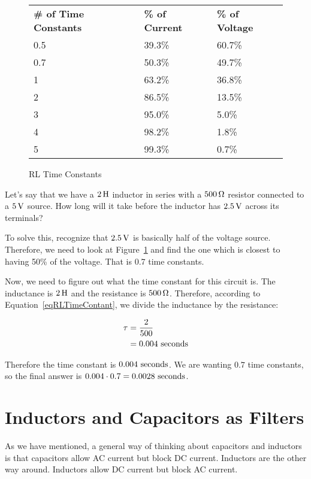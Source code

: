 \begin{figure}
\caption{RL Time Constants}
\label{figRLTimeConstants}
\begin{tabular}{|l|l|l}
\textbf{\# of Time Constants} & \textbf{\% of Current} & \textbf{\% of Voltage} \\
0.5 & 39.3\% & 60.7\% \\
0.7 & 50.3\% & 49.7\% \\
1 & 63.2\% & 36.8\% \\
2 & 86.5\% & 13.5\% \\
3 & 95.0\% & 5.0\% \\
4 & 98.2\% & 1.8\% \\
5 & 99.3\% & 0.7\% \\
\end{tabular}
\end{figure}

\begin{exampleprob}
Let's say that we have a $2\myhy$ inductor in series with a $500\,\si{\ohm}$ resistor connected to a $5\,\si{\volt}$ source.
How long will it take before the inductor has $2.5\,\si{\volt}$ across its terminals?

To solve this, recognize that $2.5\,\si{\volt}$ is basically half of the voltage source.
Therefore, we need to look at Figure~\ref{figRLTimeConstants} and find the one which is closest to having 50\% of the voltage.
That is 0.7 time constants.

Now, we need to figure out what the time constant for this circuit is.
The inductance is $2\myhy$ and the resistance is $500\,\si{\ohm}$.  
Therefore, according to Equation~\ref{eqRLTimeContant}, we divide the inductance by the resistance:

\begin{align*}
\tau &= \frac{2}{500} \\
     &= 0.004\textrm{ seconds}
\end{align*}

Therefore the time constant is $0.004\textrm{ seconds}$.
We are wanting $0.7$ time constants, so the final answer is $0.004 \cdot 0.7 = 0.0028\textrm{ seconds}$.
\end{exampleprob}

\section{Inductors and Capacitors as Filters}

As we have mentioned, a general way of thinking about capacitors and inductors is that capacitors allow AC current but block DC current.
Inductors are the other way around.
Inductors allow DC current but block AC current.

